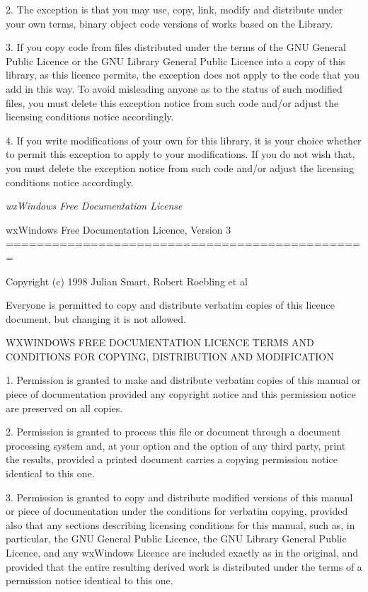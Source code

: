 2. The exception is that you may use, copy, link, modify and distribute
under your own terms, binary object code versions of works based on the
Library.

3. If you copy code from files distributed under the terms of the GNU
General Public Licence or the GNU Library General Public Licence into a
copy of this library, as this licence permits, the exception does not apply
to the code that you add in this way.  To avoid misleading anyone as to the
status of such modified files, you must delete this exception notice from
such code and/or adjust the licensing conditions notice accordingly.

4. If you write modifications of your own for this library, it is your
choice whether to permit this exception to apply to your modifications.  If
you do not wish that, you must delete the exception notice from such code
and/or adjust the licensing conditions notice accordingly.

\textit{wxWindows Free Documentation License}

\begin{center}
wxWindows Free Documentation Licence, Version 3
===============================================
\end{center}

Copyright (c) 1998 Julian Smart, Robert Roebling et al

Everyone is permitted to copy and distribute verbatim copies
of this licence document, but changing it is not allowed.

\begin{center}
WXWINDOWS FREE DOCUMENTATION LICENCE
TERMS AND CONDITIONS FOR COPYING, DISTRIBUTION AND MODIFICATION
\end{center}

1. Permission is granted to make and distribute verbatim copies of this
manual or piece of documentation provided any copyright notice and this
permission notice are preserved on all copies.

2. Permission is granted to process this file or document through a
document processing system and, at your option and the option of any third
party, print the results, provided a printed document carries a copying
permission notice identical to this one.

3. Permission is granted to copy and distribute modified versions of this
manual or piece of documentation under the conditions for verbatim copying,
provided also that any sections describing licensing conditions for this
manual, such as, in particular, the GNU General Public Licence, the GNU
Library General Public Licence, and any wxWindows Licence are included
exactly as in the original, and provided that the entire resulting derived
work is distributed under the terms of a permission notice identical to
this one.

